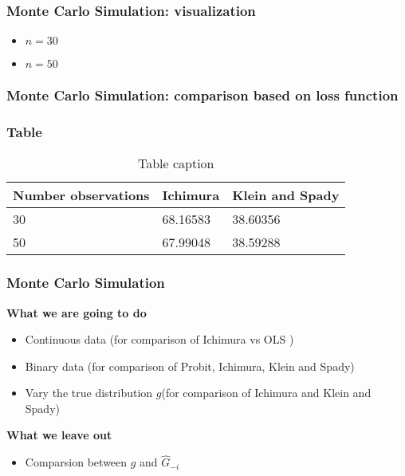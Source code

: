 \documentclass{beamer}
\begin{document}
 \begin{frame}[t]
	\frametitle{Monte Carlo Simulation: visualization}
\begin{itemize}

\item  $n = 30$

\item  $n = 50$
\end{itemize}
	\note{~}
\end{frame}


 \begin{frame}[t]
	\frametitle{Monte Carlo Simulation: comparison based on loss function}

\frametitle{Table}
\begin{table}
\begin{tabular}{l l l}
\toprule
\textbf{Number observations} & \textbf{Ichimura} & \textbf{Klein and Spady}\\
\midrule
30 & 68.16583 & 38.60356 \\
50 & 67.99048 & 38.59288 \\
\bottomrule
\end{tabular}
\caption{Table caption}
\end{table}
	\note{~}
\end{frame}


\begin{frame}[t]
	\frametitle{Monte Carlo Simulation}

	\textbf{What we are going to do}
	\begin{itemize}
		\item Continuous data (for comparison of Ichimura vs OLS )
		\item Binary data (for comparison of Probit, Ichimura, Klein and Spady)
           \item Vary the true distribution $g$(for comparison of Ichimura and Klein and Spady)
	\end{itemize}
	\textbf{What we leave out}
	\begin{itemize}
		\item Comparsion between $g$ and $ \hat{G}_{-i} $
	\end{itemize}
	\note{~}
\end{frame}
\end{document}
